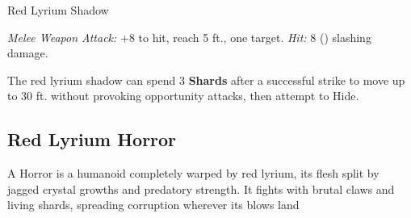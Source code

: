 \begin{monsterbox}{Red Lyrium Shadow}

\begin{rpg-monsteraction}
\textit{Melee Weapon Attack:} +8 to hit, reach 5 ft., one target. \textit{Hit:} 8 () slashing damage.
\end{rpg-monsteraction}


\begin{rpg-monsteraction}[Vanish]
The red lyrium shadow can spend 3 \textbf{Shards} after a successful strike to move up to 30 ft. without provoking opportunity attacks, then attempt to Hide.
\end{rpg-monsteraction}

\end{monsterbox}

\newpage

\subsection{Red Lyrium Horror}

A Horror is a humanoid completely warped by red lyrium, its flesh split by jagged crystal growths and predatory strength. It fights with brutal claws and living shards, spreading corruption wherever its blows land

